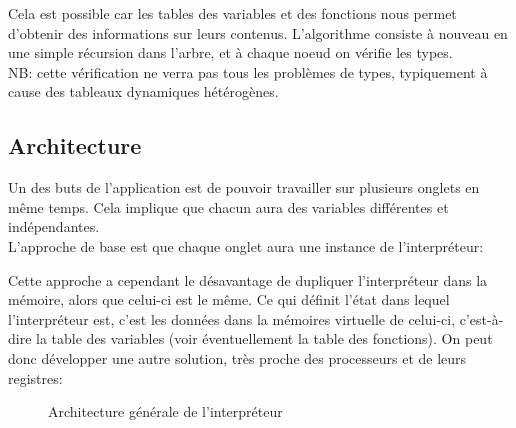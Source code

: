\documentclass[french]{article}
\begin{document}
				Cela est possible car les tables des variables et des fonctions nous permet d'obtenir des informations sur leurs contenus. L'algorithme consiste à nouveau en une simple récursion dans l'arbre, et à chaque noeud on vérifie les types.\\
				
				NB: cette vérification ne verra pas tous les problèmes de types, typiquement à cause des tableaux dynamiques hétérogènes.
			
		\subsection{Architecture}
			Un des buts de l'application est de pouvoir travailler sur plusieurs onglets en même temps. Cela implique que chacun aura des variables différentes et indépendantes.\\
			
			L'approche de base est que chaque onglet aura une instance de l'interpréteur:
			
			\begin{figure}[H]
				\centering
			\end{figure}
			
			Cette approche a cependant le désavantage de dupliquer l'interpréteur dans la mémoire, alors que celui-ci est le même. Ce qui définit l'état dans lequel l'interpréteur est, c'est les données dans la mémoires virtuelle de celui-ci, c'est-à-dire la table des variables (voir éventuellement la table des fonctions). On peut donc développer une autre solution, très proche des processeurs et de leurs registres:
			
			\begin{figure}[H]
				\centering
				\caption{Architecture générale de l'interpréteur}
			\end{figure}
			
\end{document}
